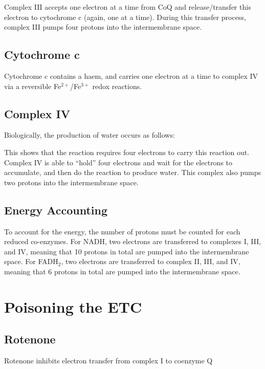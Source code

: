 Complex III accepts one electron at a time from CoQ and release/transfer this electron to cytochrome c (again, one at a time).
During this transfer process, complex III pumps four protons into the intermembrane space.

\subsection{Cytochrome c}

Cytochrome c contains a haem, and carries one electron at a time to complex IV via a reversible Fe$^{2+}$/Fe$^{3+}$ redox reactions.

\subsection{Complex IV}

Biologically, the production of water occurs as follows:

\begin{center}
\end{center}

This shows that the reaction requires four electrons to carry this reaction out.
Complex IV is able to ``hold'' four electrons and wait for the electrons to accumulate, and then do the reaction to produce water.
This complex also pumps two protons into the intermembrane space.

\subsection{Energy Accounting}

To account for the energy, the number of protons must be counted for each reduced co-enzymes.
For NADH, two electrons are transferred to complexes I, III, and IV, meaning that 10 protons in total are pumped into the intermembrane space.
For FADH$_2$, two electrons are transferred to complex II, III, and IV, meaning that 6 protons in total are pumped into the intermembrane space.

\section{Poisoning the ETC}

\subsection{Rotenone}

Rotenone inhibits electron transfer from complex I to coenzyme Q

